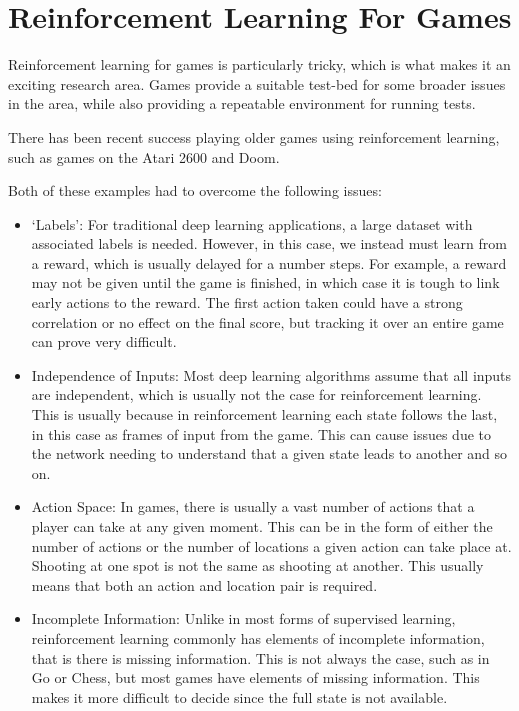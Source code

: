 \section{Reinforcement Learning For Games}\label{challenges:games}

Reinforcement learning for games is particularly tricky, which is what makes it
an exciting research area. Games provide a suitable test-bed for some broader
issues in the area, while also providing a repeatable environment for running
tests.

There has been recent success playing older games using reinforcement learning,
such as games on the Atari 2600\cite{mnih2013playing} and
Doom\cite{kempka2016vizdoom}.

Both of these examples had to overcome the following issues:

\begin{itemize}
    \item `Labels': For traditional deep learning applications, a large dataset
        with associated labels is needed. However, in this case, we instead must
        learn from a reward, which is usually delayed for a number steps. For
        example, a reward may not be given until the game is finished, in which
        case it is tough to link early actions to the reward. The first
        action taken could have a strong correlation or no effect on the final
        score, but tracking it over an entire game can prove very difficult.
    \item Independence of Inputs: Most deep learning algorithms assume that
        all inputs are independent, which is usually not the case for
        reinforcement learning. This is usually because in reinforcement
        learning each state follows the last, in this case as frames of input
        from the game. This can cause issues due to the network needing to
        understand that a given state leads to another and so on.
    \item Action Space: In games, there is usually a vast number of actions that
        a player can take at any given moment. This can be in the form of either
        the number of actions or the number of locations a given action can
        take place at. Shooting at one spot is not the same as shooting at
        another. This usually means that both an action and location pair is
        required.
    \item Incomplete Information: Unlike in most forms of supervised learning,
        reinforcement learning commonly has elements of incomplete information,
        that is there is missing information. This is not always the case, such
        as in Go or Chess, but most games have elements of missing information.
        This makes it more difficult to decide since the full state is
        not available.
\end{itemize}

